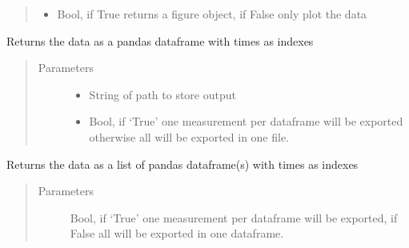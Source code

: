 \documentclass[letterpaper,10pt,english]{sphinxmanual}
\begin{document}
\begin{fulllineitems}
\begin{fulllineitems}
\begin{quote}
\begin{description}
\begin{itemize}
\item {} 
 \textendash{} Bool, if True returns a figure object, if False only plot the data

\end{itemize}

\end{description}\end{quote}

\end{fulllineitems}


\begin{fulllineitems}
\label{\detokenize{platelib:platelib.plateread.Plate_data.to_a_csv}}
Returns the data as a pandas dataframe with times as indexes
\begin{quote}\begin{description}
\item[{Parameters}] \leavevmode\begin{itemize}
\item {} 
 \textendash{} String of path to store output

\item {} 
 \textendash{} Bool, if ‘True’ one measurement per dataframe will be exported otherwise all will be exported in one file.

\end{itemize}

\end{description}\end{quote}

\end{fulllineitems}


\begin{fulllineitems}
\label{\detokenize{platelib:platelib.plateread.Plate_data.to_a_dataframe}}
Returns the data as a list of pandas dataframe(s) with times as indexes
\begin{quote}\begin{description}
\item[{Parameters}] \leavevmode
{} \textendash{} Bool, if ‘True’ one measurement per dataframe will be exported, if False all will be exported in one dataframe.

\end{description}\end{quote}

\end{fulllineitems}


\end{fulllineitems}
\end{document}
